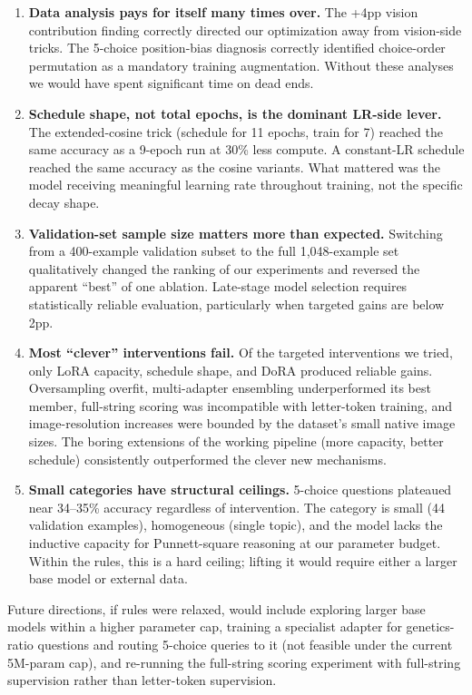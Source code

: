 \documentclass[11pt]{article}
\begin{document}
\begin{enumerate}
    \item \textbf{Data analysis pays for itself many times over.} The +4pp vision contribution finding correctly directed our optimization away from vision-side tricks. The 5-choice position-bias diagnosis correctly identified choice-order permutation as a mandatory training augmentation. Without these analyses we would have spent significant time on dead ends.
    \item \textbf{Schedule shape, not total epochs, is the dominant LR-side lever.} The extended-cosine trick (schedule for 11 epochs, train for 7) reached the same accuracy as a 9-epoch run at 30\% less compute. A constant-LR schedule reached the same accuracy as the cosine variants. What mattered was the model receiving meaningful learning rate throughout training, not the specific decay shape.
    \item \textbf{Validation-set sample size matters more than expected.} Switching from a 400-example validation subset to the full 1{,}048-example set qualitatively changed the ranking of our experiments and reversed the apparent ``best'' of one ablation. Late-stage model selection requires statistically reliable evaluation, particularly when targeted gains are below 2pp.
    \item \textbf{Most ``clever'' interventions fail.} Of the targeted interventions we tried, only LoRA capacity, schedule shape, and DoRA produced reliable gains. Oversampling overfit, multi-adapter ensembling underperformed its best member, full-string scoring was incompatible with letter-token training, and image-resolution increases were bounded by the dataset's small native image sizes. The boring extensions of the working pipeline (more capacity, better schedule) consistently outperformed the clever new mechanisms.
    \item \textbf{Small categories have structural ceilings.} 5-choice questions plateaued near 34--35\% accuracy regardless of intervention. The category is small (44 validation examples), homogeneous (single topic), and the model lacks the inductive capacity for Punnett-square reasoning at our parameter budget. Within the rules, this is a hard ceiling; lifting it would require either a larger base model or external data.
\end{enumerate}

Future directions, if rules were relaxed, would include exploring larger base models within a higher parameter cap, training a specialist adapter for genetics-ratio questions and routing 5-choice queries to it (not feasible under the current 5M-param cap), and re-running the full-string scoring experiment with full-string supervision rather than letter-token supervision.
\end{document}

